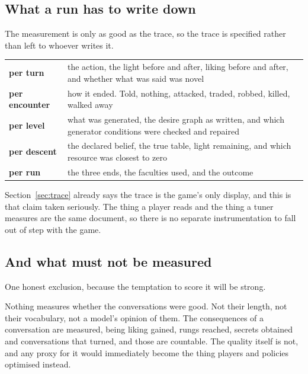 \documentclass[11pt,a4paper]{article}
\begin{document}
\subsection{What a run has to write down}

The measurement is only as good as the trace, so the trace is specified rather than left to
whoever writes it.

\begin{center}
\begin{tabular}{@{}l@{\hspace{4mm}}>{\raggedright\arraybackslash}p{}@{}}
\toprule
\textbf{per turn}     & the action, the light before and after, liking before and after, and whether
what was said was novel \\[1mm]
\textbf{per encounter}& how it ended. Told, nothing, attacked, traded, robbed, killed, walked away
\\[1mm]
\textbf{per level}    & what was generated, the desire graph as written, and which generator
conditions were checked and repaired \\[1mm]
\textbf{per descent}  & the declared belief, the true table, light remaining, and which resource was
closest to zero \\[1mm]
\textbf{per run}      & the three ends, the faculties used, and the outcome \\
\bottomrule
\end{tabular}
\end{center}

Section~\ref{sec:trace} already says the trace is the game's only display, and this is that claim
taken seriously. The thing a player reads and the thing a tuner measures are the same document, so
there is no separate instrumentation to fall out of step with the game.

\subsection{And what must not be measured}

One honest exclusion, because the temptation to score it will be strong.

Nothing measures whether the conversations were good. Not their length, not their vocabulary, not a
model's opinion of them. The consequences of a conversation are measured, being liking gained, rungs
reached, secrets obtained and conversations that turned, and those are countable. The quality
itself is not, and any proxy for it would immediately become the thing players and policies
optimised instead.
\end{document}
